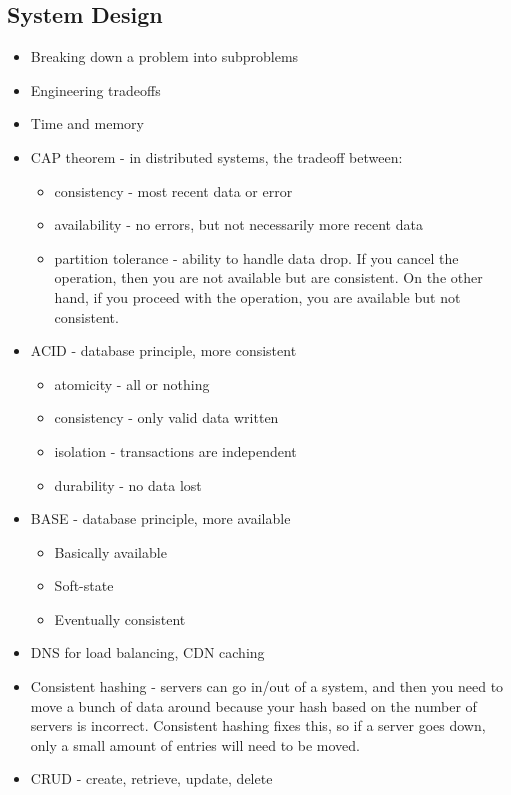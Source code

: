\documentclass{article}
\begin{document}
\subsection{System Design}
\begin{itemize}
    \item Breaking down a problem into subproblems
    \item Engineering tradeoffs
    \item Time and memory
    \item CAP theorem - in distributed systems, the tradeoff between:
    \begin{itemize}
        \item consistency - most recent data or error
        \item availability - no errors, but not necessarily more recent data
        \item partition tolerance - ability to handle data drop. If you cancel the operation, then you are not available but are consistent. On the other hand, if you proceed with the operation, you are available but not consistent.
    \end{itemize}
    \item ACID - database principle, more consistent
    \begin{itemize}
        \item atomicity - all or nothing
        \item consistency - only valid data written
        \item isolation - transactions are independent
        \item durability - no data lost
    \end{itemize}
    \item BASE - database principle, more available
    \begin{itemize}
        \item Basically available
        \item Soft-state
        \item Eventually consistent
    \end{itemize}
    \item DNS for load balancing, CDN caching
    \item Consistent hashing - servers can go in/out of a system, and then you need to move a bunch of data around because your hash based on the number of servers is incorrect. Consistent hashing fixes this, so if a server goes down, only a small amount of entries will need to be moved.
    \item CRUD - create, retrieve, update, delete
\end{itemize}
\end{document}
